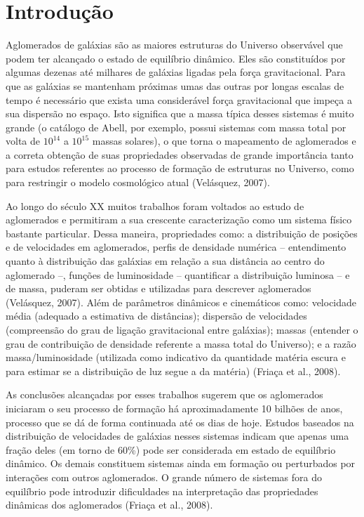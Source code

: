 %
%

\chapter{Introdução}\label{chap:introducao}
Aglomerados de galáxias são as maiores estruturas do Universo observável que podem
ter alcançado o estado de equilíbrio dinâmico. Eles são constituídos por algumas dezenas até
milhares de galáxias ligadas pela força gravitacional. Para que as galáxias se mantenham
próximas umas das outras por longas escalas de tempo é necessário que exista uma
considerável força gravitacional que impeça a sua dispersão no espaço. Isto significa que a
massa típica desses sistemas é muito grande (o catálogo de Abell, por exemplo, possui sistemas
com massa total por volta de $10^{14}$ a $10^{15}$ massas solares), o que torna o mapeamento de
aglomerados e a correta obtenção de suas propriedades observadas de grande importância
tanto para estudos referentes ao processo de formação de estruturas no Universo, como para
restringir o modelo cosmológico atual (Velásquez, 2007).

Ao longo do século XX muitos trabalhos foram voltados ao estudo de aglomerados e
permitiram a sua crescente caracterização como um sistema físico bastante particular. Dessa
maneira, propriedades como: a distribuição de posições e de velocidades em aglomerados,
perfis de densidade numérica – entendimento quanto à distribuição das galáxias em relação a
sua distância ao centro do aglomerado –, funções de luminosidade – quantificar a distribuição
luminosa – e de massa, puderam ser obtidas e utilizadas para descrever aglomerados
(Velásquez, 2007). Além de parâmetros dinâmicos e cinemáticos como: velocidade média
(adequado a estimativa de distâncias); dispersão de velocidades (compreensão do grau de
ligação gravitacional entre galáxias); massas (entender o grau de contribuição de densidade
referente a massa total do Universo); e a razão massa/luminosidade (utilizada como indicativo
da quantidade matéria escura e para estimar se a distribuição de luz segue a da matéria)
(Friaça et al., 2008).

As conclusões alcançadas por esses trabalhos sugerem que os aglomerados iniciaram o
seu processo de formação há aproximadamente 10 bilhões de anos, processo que se dá de
forma continuada até os dias de hoje. Estudos baseados na distribuição de velocidades de
galáxias nesses sistemas indicam que apenas uma fração deles (em torno de 60\%) pode ser
considerada em estado de equilíbrio dinâmico. Os demais constituem sistemas ainda em
formação ou perturbados por interações com outros aglomerados. O grande número de
sistemas fora do equilíbrio pode introduzir dificuldades na interpretação das propriedades
dinâmicas dos aglomerados (Friaça et al., 2008).

